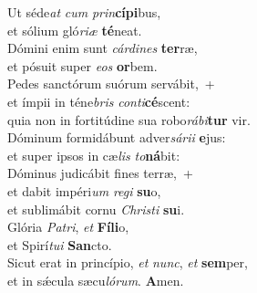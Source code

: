\evenverse Ut séde\textit{at} \textit{cum} \textit{prin}\textbf{cí}\textbf{pi}bus,~\*\\
\evenverse et sólium gló\textit{ri}\textit{æ} \textbf{té}neat.\\
\oddverse Dómini enim sunt \textit{cár}\textit{di}\textit{nes} \textbf{ter}ræ,~\*\\
\oddverse et pósuit super \textit{e}\textit{os} \textbf{or}bem.\\
\evenverse Pedes sanctórum suórum servábit,~+\\
\evenverse  et ímpii in téne\textit{bris} \textit{con}\textit{ti}\textbf{cé}scent:~\*\\
\evenverse quia non in fortitúdine sua robo\textit{rá}\textit{bi}\textbf{tur} vir.\\
\oddverse Dóminum formidábunt adver\textit{sá}\textit{ri}\textit{i} \textbf{e}jus:~\*\\
\oddverse et super ipsos in cæ\textit{lis} \textit{to}\textbf{ná}bit:\\
\evenverse Dóminus judicábit fines terræ,~+\\
\evenverse  et dabit impéri\textit{um} \textit{re}\textit{gi} \textbf{su}o,~\*\\
\evenverse et sublimábit cornu \textit{Chri}\textit{sti} \textbf{su}i.\\
\oddverse Glória \textit{Pa}\textit{tri}, \textit{et} \textbf{Fí}\textbf{li}o,~\*\\
\oddverse et Spirí\textit{tu}\textit{i} \textbf{San}cto.\\
\evenverse Sicut erat in princípio, \textit{et} \textit{nunc}, \textit{et} \textbf{sem}per,~\*\\
\evenverse et in sǽcula sæcu\textit{ló}\textit{rum}. \textbf{A}men.\\
